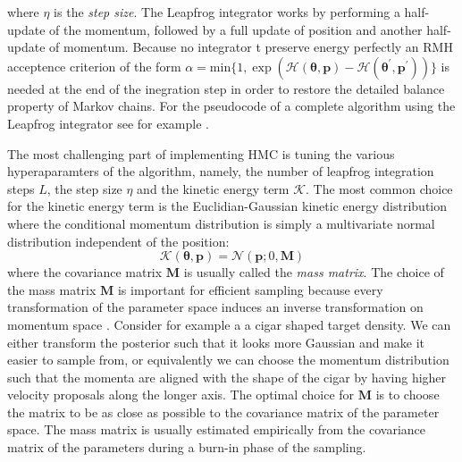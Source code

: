 \documentclass[12pt,dvipsnames]{report}
\renewcommand{\vec}[1]{\boldsymbol{\mathbf{#1}}}
\begin{document}
where $\eta$ is the \textsl{step size}. The Leapfrog integrator works by performing a
half-update of the momentum, followed by a full update of position and another half-update 
of momentum.
Because no integrator t preserve energy perfectly an RMH acceptence criterion of the form 
$\alpha=\mathrm{min}\{1,\exp (\mathcal{H}(\boldsymbol{\theta}, \mathbf p) -\mathcal{H}(\boldsymbol{\theta}^\prime, \vec p^\prime))\}$ 
is needed at the end of the inegration step in order to restore the detailed balance 
property of Markov chains.
For the pseudocode of a complete algorithm using the Leapfrog integrator see 
for example \citet{murphy_book_2023}.


The most challenging part of implementing HMC is tuning the various hyperaparamters of 
the algorithm, namely, the number of leapfrog integration steps $L$, the step size
$\eta$ and the kinetic energy term $\mathcal{K}$.
The most common choice for the kinetic energy term is the Euclidian-Gaussian kinetic 
energy distribution where  the conditional momentum distribution is simply a 
multivariate normal distribution independent of the position:
\begin{equation}
\mathcal{K}(\vec\theta, \vec p) = \mathcal{N}(\mathbf p ; 0, \mathbf M)
\end{equation}
where the covariance matrix $\mathbf M$ is usually called the \textsl{mass matrix}.
The choice of the mass matrix $\mathbf{M}$ is important for efficient sampling because 
every transformation of the parameter space induces an inverse transformation on 
momentum space \citep{arXiv:1701.02434}. Consider for example a a cigar shaped target 
density.
We can either transform the posterior such that it looks more Gaussian and make it
 easier to sample from, or equivalently we can choose the momentum distribution such 
 that the momenta are aligned with the shape of the cigar by having higher velocity 
 proposals along the longer axis.
The optimal choice for $\mathbf{M}$ is to choose the matrix to be as close as 
possible to the covariance matrix of the parameter space.
The mass matrix is usually estimated empirically from the covariance matrix of the 
parameters during a burn-in phase of the sampling. 
\end{document}
